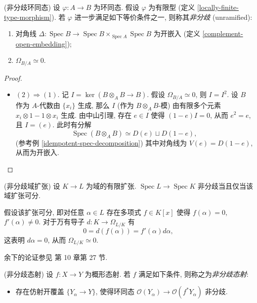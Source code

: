 \documentclass{book}
\begin{document}
	\begin{propdef}
		{(非分歧环同态)}
		设 $\varphi\colon A\to B$ 为环同态. 假设 $\varphi$ 为有限型 (定义 \ref{locally-finite-type-morphism}). 若 $\varphi$ 进一步满足如下等价条件之一, 则称其\emph{非分歧} (unramified):
		\begin{enumerate}[(1)]
			\item 对角线 $\Delta\colon \operatorname{Spec} B\to \operatorname{Spec} B\times_{\operatorname{Spec} A}\operatorname{Spec} B$ 为开嵌入 (定义 \ref{complement-open-embedding});
			\item $\Omega_{B/A}\simeq 0$.
		\end{enumerate}
	\end{propdef}
	\begin{proof}~
		\begin{itemize}
			\item $(2)\Rightarrow (1)$. 记 $I = \ker (B\otimes_A B \to B)$. 假设 $\Omega_{B/A}\simeq 0$, 则 $I=I^2$. 设 $B$ 作为 $A$-代数由 $\{x_i\}$ 生成, 那么 $I$ (作为 $B\otimes_A B$-模) 由有限多个元素 $x_i\otimes 1 - 1\otimes x_i$ 生成.
			由中山引理, 存在 $e\in I$ 使得 $(1-e)I=0$, 从而 $e^2=e$, 且 $I=(e)$. 此时有分解 $$\operatorname{Spec} (B\otimes_A B) \simeq D(e) \sqcup D(1-e),$$
			(参考例 \ref{idempotent-spec-decomposition}) 其中对角线为 $V(e)=D(1-e)$, 从而为开嵌入.
		\end{itemize}
		
	\end{proof}
	
	\begin{example}
		{(非分歧域扩张)}
		设 $K\to L$ 为域的有限扩张.
		$\operatorname{Spec} L \to \operatorname{Spec} K$ 非分歧当且仅当该域扩张可分.
		
		假设该扩张可分, 即对任意 $\alpha\in L$ 存在多项式 $f\in K[x]$ 使得 $f(\alpha) = 0$, $f'(\alpha)\neq 0$. 对于万有导子 $d\colon K \to\Omega_{L/K}$ 有 $$0=d(f(\alpha))=f'(\alpha)d\alpha,$$
		这表明 $d\alpha = 0$, 从而 $\Omega_{L/K}\simeq 0$.
		
		余下的论证参见 \cite{Mat70} 第 10 章第 27 节. %
	\end{example}
%		
	
	\begin{definition}
		{(非分歧态射)}
		设 $f\colon X\to Y$ 为概形态射. 若 $f$ 满足如下条件, 则称之为\emph{非分歧态射}:
		\begin{itemize}
			\item 存在仿射开覆盖 $\{Y_\alpha\to Y\}$, 使得环同态 $\mathcal O(Y_\alpha) \to \mathcal O(f^*Y_\alpha)$ 非分歧.
		\end{itemize}
	\end{definition}
	
\end{document}
